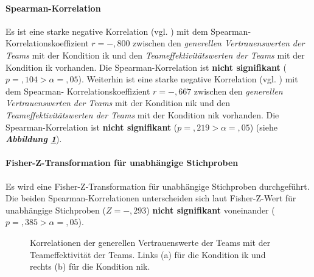 \documentclass[a4paper,11pt]{article}%
\renewcommand{\\}{\vspace*{0.5\baselineskip} \newline}
\begin{document}
{\paragraph{Spearman-Korrelation}
Es ist eine starke negative Korrelation (vgl. \citep{cohen2013statistical}) mit dem Spearman-Korrelationskoeffizient $r = -,800$ zwischen den \textit{generellen Vertrauenswerten der Teams} mit der Kondition \ac{ik} und den \textit{Teameffektivitätswerten der Teams} mit der Kondition \newline \ac{ik} vorhanden. Die Spearman-Korrelation ist \textbf{nicht signifikant} ($p =,104 > \alpha = ,05$).\\
Weiterhin ist eine starke negative Korrelation (vgl. \citep{cohen2013statistical}) mit dem Spearman- Korrelationskoeffizient $r = -,667$ zwischen den \textit{generellen Vertrauenswerten der Teams} mit der Kondition \ac{nik} und den \textit{Teameffektivitätswerten der Teams} mit der Kondition \newline \ac{nik} vorhanden. Die Spearman-Korrelation ist \textbf{nicht signifikant} ($p =,219 > \alpha = ,05$) (siehe \textbf{\textit{Abbildung \ref{H5_Korrelation_Auswertung}}}). 

\paragraph{Fisher-Z-Transformation für unabhängige Stichproben}
Es wird eine Fisher-Z-Transformation für unabhängige Stichproben durchgeführt.
Die beiden Spearman-Korrelationen unterscheiden sich laut Fisher-Z-Wert für unabhängige Stichproben ($Z=-,293$) \textbf{nicht signifikant} voneinander ($p =,385 > \alpha = ,05$).

\begin{figure}[h]
  \centering
  \qquad
  \caption[Korrelationen der generellen Vertrauenswerte der Teams mit der Teameffektivität der Teams]{Korrelationen der generellen Vertrauenswerte der Teams mit der Teameffektivität der Teams. Links (a) für die Kondition \ac{ik} und rechts (b) für die Kondition \ac{nik}.}
  \label{H5_Korrelation_Auswertung}
\end{figure}

}
\end{document}
